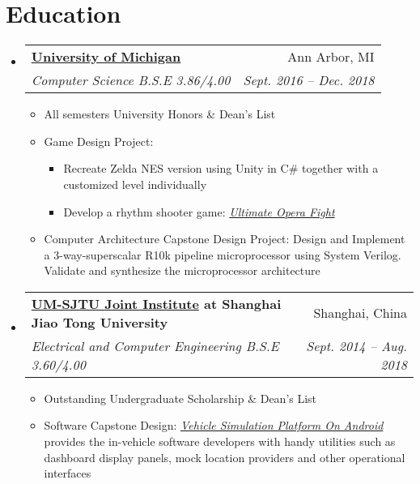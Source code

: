 \documentclass[letterpaper,10pt]{article}
\makeatletter
\newcommand{\resumeSubheading}[5]{
      \vspace{-1pt}\item
        \begin{tabular*}{0.97\textwidth}{l@{\extracolsep{\fill}}r}
          \textbf{#1} & #2 \\
          \textit{\small#3} & \textit{\small #4} \\
        \end{tabular*}\vspace{#5 pt}
    }
\newcommand{\resumeSubHeadingListStart}{\begin{itemize}[leftmargin=*]}
\newcommand{\resumeSubHeadingListEnd}{\end{itemize}}
\makeatother
\begin{document}
   \section{\faBook Education}
   \resumeSubHeadingListStart
     \resumeSubheading
       {\href{http://www.umich.edu}{University of Michigan}}{Ann Arbor, MI}
       {Computer Science B.S.E 3.86/4.00}{Sept. 2016 -- Dec. 2018}{-5}
       \begin{itemize}
         \item All semesters University Honors \& Dean's List
         \item Game Design Project: 
           \begin{itemize}
             \item Recreate Zelda NES version using Unity in C\# together with a customized level individually
             \item Develop a rhythm shooter game: \href{http://www.hanfa.me/projects/index.html#opera-a-rhythm-shooter-game}{\textit{Ultimate Opera Fight}}
           \end{itemize}
         
         
         \item Computer Architecture Capstone Design Project: Design and Implement a 3-way-superscalar R10k pipeline microprocessor using System Verilog. Validate and synthesize the microprocessor architecture
       \end{itemize}
     \resumeSubheading
       {\href{http://umji.sjtu.edu.cn/global/}{UM-SJTU Joint Institute} at Shanghai Jiao Tong University}{Shanghai, China}
       {Electrical and Computer Engineering B.S.E 3.60/4.00}{Sept. 2014 -- Aug. 2018}{-5}
       \begin{itemize}
         \item Outstanding Undergraduate Scholarship \& Dean's List
         \item Software Capstone Design: \href{http://www.hanfa.me/projects/index.html#justgo-integrated-virtual-vehicle-simulation-platform-on-android}{\textit{Vehicle Simulation Platform On Android}} provides the in-vehicle software developers with handy utilities such as dashboard display panels, mock location providers and other operational interfaces
       \end{itemize}
   \resumeSubHeadingListEnd



\end{document}
